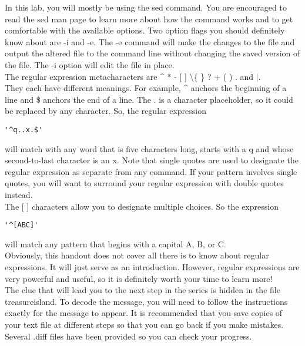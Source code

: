 \documentclass[11pt,a4paper]{article}
\begin{document}
In this lab, you will mostly be using the sed command. You are encouraged to read the sed man page to learn more about how the command works and to get comfortable with the available options. Two option flags you should definitely know about are -i and -e. The -e command will make the changes to the file and output the altered file to the command line without changing the saved version of the file. The -i option will edit the file in place. \\

The regular expression metacharacters are \^{} * - [ ]  \textbackslash  \{ \} ? + ( ) . and $\vert$. \\

They each have different meanings. For example, \^{} anchors the beginning of a line and \$ anchors the end of a line. The . is a character placeholder, so it could be replaced by any character. So, the regular expression \\

\begin{center}
\verb|'^q..x.$'|
\end{center}

\noindent will match with any word that is five characters long, starts with a q and whose second-to-last character is an x. Note that single quotes are used to designate the regular expression as separate from any command. If your pattern involves single quotes, you will want to surround your regular expression with double quotes instead. \\

The [ ] characters allow you to designate multiple choices. So the expression

\begin{center}
\verb|'^[ABC]'|
\end{center}

\noindent will match any pattern that begins with a capital A, B, or C.\\

Obviously, this handout does not cover all there is to know about regular expressions. It will just serve as an introduction. However, regular expressions are very powerful and useful, so it is definitely worth your time to learn more!\\

The clue that will lead you to the next step in the series is hidden in the file treasureisland. To decode the message, you will need to follow the instructions exactly for the message to appear. It is recommended that you save copies of your text file at different steps so that you can go back if you make mistakes. Several .diff files have been provided so you can check your progress.\\
\end{document}
